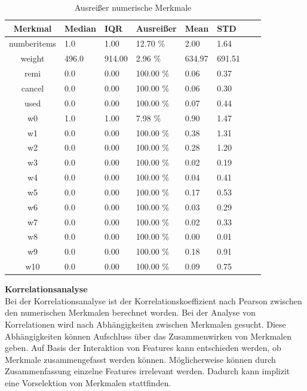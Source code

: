 \FloatBarrier
\begin{table}[!htbp]
\centering
\begin{tabular*}{\textwidth}{c @{\extracolsep{\fill}} lllllll}
\toprule
\textbf{Merkmal} & \textbf{Median} & \textbf{IQR}  & \textbf{Ausreißer} & \textbf{Mean} & \textbf{STD}\\
\midrule
numberitems & 1.0 & 1.00 & 12.70 \% & 2.00 & 1.64 \\
weight & 496.0 & 914.00 & 2.96 \% & 634.97 & 691.51\\
remi & 0.0 & 0.00 & 100.00 \% & 0.06 & 0.37\\
cancel & 0.0 & 0.00 & 100.00 \% & 0.06 & 0.30 \\
used & 0.0 & 0.00 & 100.00 \% & 0.07 & 0.44\\
w0 & 1.0 & 1.00 & 7.98 \% & 0.90 & 1.47\\
w1 & 0.0 & 0.00 & 100.00 \% & 0.38 & 1.31\\
w2 & 0.0 & 0.00 & 100.00 \% & 0.28 & 1.20\\
w3 & 0.0 & 0.00 & 100.00 \% & 0.02 & 0.19\\
w4 & 0.0 & 0.00 & 100.00 \% & 0.04 & 0.41\\
w5 & 0.0 & 0.00 & 100.00 \% & 0.17 & 0.53\\
w6 & 0.0 & 0.00 & 100.00 \% & 0.03 & 0.29\\
w7 & 0.0 & 0.00 & 100.00 \% & 0.02 & 0.33\\
w8 & 0.0 & 0.00 & 100.00 \% & 0.00 & 0.01\\
w9 & 0.0 & 0.00 & 100.00 \% & 0.18 & 0.91\\
w10 & 0.0 & 0.00 & 100.00 \% & 0.09 & 0.75\\
\bottomrule
\end{tabular*}
\caption{Ausreißer numerische Merkmale}
\label{table: outlier}
\end{table}
\FloatBarrier

\textbf{Korrelationsanalyse}\\

Bei der Korrelationsanalyse ist der Korrelationskoeffizient nach Pearson zwischen den numerischen Merkmalen berechnet worden. Bei der Analyse von Korrelationen wird nach Abhängigkeiten zwischen Merkmalen gesucht. Diese Abhängigkeiten können Aufschluss über das Zusammenwirken von Merkmalen geben. Auf Basis der Interaktion von Features kann entschieden werden, ob Merkmale zusammengefasst werden können. Möglicherweise können durch Zusammenfassung einzelne Features irrelevant werden. Dadurch kann implizit eine Vorselektion von Merkmalen stattfinden.\pagebreak

